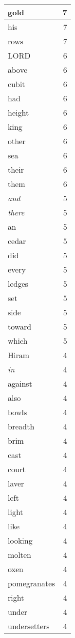 \begin{center}
\begin{longtable}{l|r}
gold & 7 \\ \hline
his & 7 \\ \hline
rows & 7 \\ \hline
LORD & 6 \\ \hline
above & 6 \\ \hline
cubit & 6 \\ \hline
had & 6 \\ \hline
height & 6 \\ \hline
king & 6 \\ \hline
other & 6 \\ \hline
sea & 6 \\ \hline
their & 6 \\ \hline
them & 6 \\ \hline
\emph{and} & 5 \\ \hline
\emph{there} & 5 \\ \hline
an & 5 \\ \hline
cedar & 5 \\ \hline
did & 5 \\ \hline
every & 5 \\ \hline
ledges & 5 \\ \hline
set & 5 \\ \hline
side & 5 \\ \hline
toward & 5 \\ \hline
which & 5 \\ \hline
Hiram & 4 \\ \hline
\emph{in} & 4 \\ \hline
against & 4 \\ \hline
also & 4 \\ \hline
bowls & 4 \\ \hline
breadth & 4 \\ \hline
brim & 4 \\ \hline
cast & 4 \\ \hline
court & 4 \\ \hline
laver & 4 \\ \hline
left & 4 \\ \hline
light & 4 \\ \hline
like & 4 \\ \hline
looking & 4 \\ \hline
molten & 4 \\ \hline
oxen & 4 \\ \hline
pomegranates & 4 \\ \hline
right & 4 \\ \hline
under & 4 \\ \hline
undersetters & 4 \\ \hline

\end{longtable}
\end{center}
